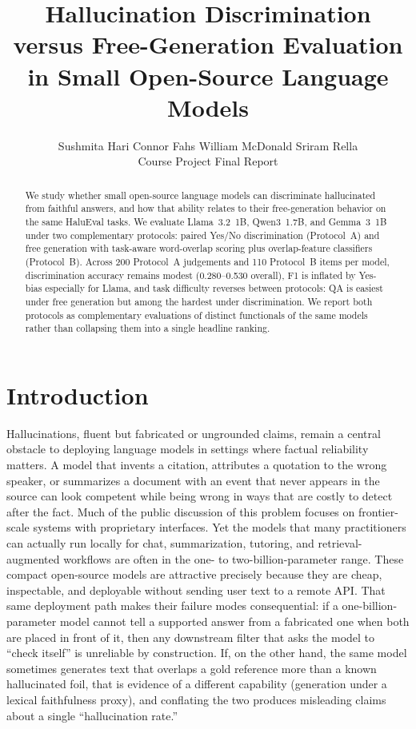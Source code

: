 \documentclass[11pt]{article}
\title{Hallucination Discrimination versus Free-Generation Evaluation\\
in Small Open-Source Language Models}
\author{
  Sushmita Hari \quad Connor Fahs \quad William McDonald \quad Sriram Rella\\
  Course Project Final Report
}
\date{}
\begin{document}
\maketitle

\begin{abstract}
We study whether small open-source language models can discriminate hallucinated
from faithful answers, and how that ability relates to their free-generation
behavior on the same HaluEval tasks. We evaluate Llama~3.2~1B, Qwen3~1.7B, and
Gemma~3~1B under two complementary protocols: paired Yes/No discrimination
(Protocol~A) and free generation with task-aware word-overlap scoring plus
overlap-feature classifiers (Protocol~B). Across 200 Protocol~A judgements and
110 Protocol~B items per model, discrimination accuracy remains modest
(0.280--0.530 overall), F1 is inflated by Yes-bias especially for Llama, and
task difficulty reverses between protocols: QA is easiest under free generation
but among the hardest under discrimination. We report both protocols as
complementary evaluations of distinct functionals of the same models rather than
collapsing them into a single headline ranking.
\end{abstract}

\section{Introduction}

Hallucinations, fluent but fabricated or ungrounded claims, remain a central
obstacle to deploying language models in settings where factual reliability
matters. A model that invents a citation, attributes a quotation to the wrong
speaker, or summarizes a document with an event that never appears in the source
can look competent while being wrong in ways that are costly to detect after the
fact. Much of the public discussion of this problem focuses on frontier-scale
systems with proprietary interfaces. Yet the models that many practitioners can
actually run locally for chat, summarization, tutoring, and retrieval-augmented
workflows are often in the one- to two-billion-parameter range. These compact
open-source models are attractive precisely because they are cheap, inspectable,
and deployable without sending user text to a remote API. That same deployment
path makes their failure modes consequential: if a one-billion-parameter model
cannot tell a supported answer from a fabricated one when both are placed in
front of it, then any downstream filter that asks the model to ``check itself''
is unreliable by construction. If, on the other hand, the same model sometimes
generates text that overlaps a gold reference more than a known hallucinated
foil, that is evidence of a different capability (generation under a lexical
faithfulness proxy), and conflating the two produces misleading claims about a
single ``hallucination rate.''
\end{document}
